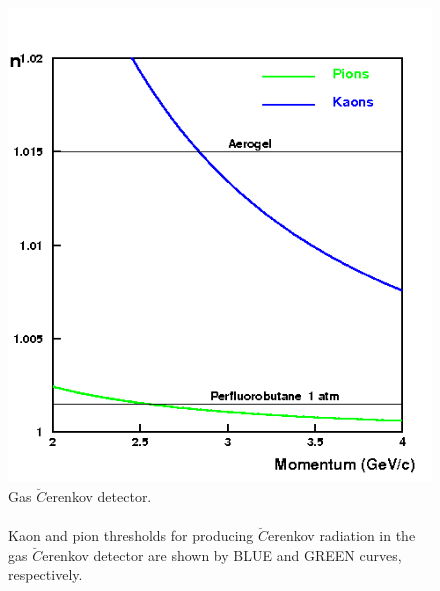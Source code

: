 \begin{figure}[!tbp]
  \centering
  \includegraphics[width=0.8\columnwidth]{pid2}
  \caption[Gas $\breve{C}$erenkov detector.]{\label{fig:pid2}Gas $\breve{C}$erenkov detector.\\\\ Kaon and pion thresholds for producing $\breve{C}$erenkov radiation in the gas $\breve{C}$erenkov detector are shown by BLUE and GREEN curves, respectively.}
\end{figure}

